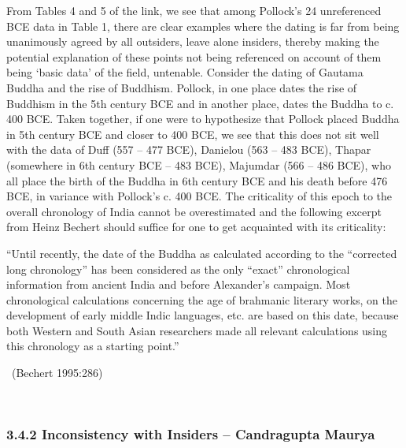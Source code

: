 From Tables 4 and 5 of the link, we see that among Pollock’s 24 unreferenced BCE data in Table 1, there are clear examples where the dating is far from being unanimously agreed by all outsiders, leave alone insiders, thereby making the potential explanation of these points not being referenced on account of them being ‘basic data’ of the field, untenable. Consider the dating of Gautama Buddha and the rise of Buddhism. Pollock, in one place dates the rise of Buddhism in the 5th century BCE and in another place, dates the Buddha to c. 400 BCE. Taken together, if one were to hypothesize that Pollock placed Buddha in 5th century BCE and closer to 400 BCE, we see that this does not sit well with the data of Duff (557 – 477 BCE), Danielou (563 – 483 BCE), Thapar (somewhere in 6th century BCE – 483 BCE), Majumdar (566 – 486 BCE), who all place the birth of the Buddha in 6th century BCE and his death before 476 BCE, in variance with Pollock’s c. 400 BCE. The criticality of this epoch to the overall chronology of India cannot be overestimated and the following excerpt from Heinz Bechert should suffice for one to get acquainted with its criticality:

\begin{myquote}
“Until recently, the date of the Buddha as calculated according to the “corrected long chronology” has been considered as the only “exact” chronological information from ancient India and before Alexander’s campaign. Most chronological calculations concerning the age of brahmanic literary works, on the development of early middle Indic languages, etc. are based on this date, because both Western and South Asian researchers made all relevant calculations using this chronology as a starting point.” 

~\hfill (Bechert 1995:286)
\end{myquote}

~
\vspace{-0.8cm}

\subsubsection*{3.4.2 Inconsistency with Insiders – Candragupta Maurya}

